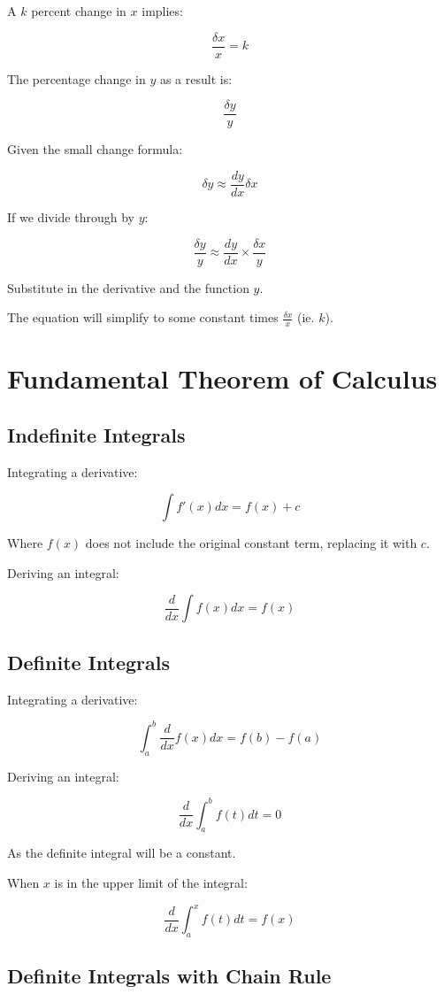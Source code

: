 \documentclass[a4paper,11pt]{article}
\begin{document}
A $k$ percent change in $x$ implies:

$$
\frac{\delta x}{x} = k
$$

The percentage change in $y$ as a result is:

$$
\frac{\delta y}{y}
$$

Given the small change formula:

$$
\delta y \approx \frac{dy}{dx} \delta x
$$

If we divide through by $y$:

$$
\frac{\delta y}{y} \approx \frac{dy}{dx} \times \frac{\delta x}{y}
$$

Substitute in the derivative and the function $y$.

The equation will simplify to some constant times $\frac{\delta x}{x}$
(ie. $k$).



\section{Fundamental Theorem of Calculus}

\subsection{Indefinite Integrals}

Integrating a derivative:

$$
\int f'(x) dx = f(x) + c
$$

Where $f(x)$ does not include the original constant term, replacing it with $c$.

Deriving an integral:

$$
\frac{d}{dx} \int f(x) dx = f(x)
$$


\subsection{Definite Integrals}

Integrating a derivative:

$$
\int_a^b \frac{d}{dx} f(x) dx = f(b) - f(a)
$$

Deriving an integral:

$$
\frac{d}{dx} \int_a^b f(t) dt = 0
$$

As the definite integral will be a constant.

When $x$ is in the upper limit of the integral:

$$
\frac{d}{dx} \int_a^x f(t) dt = f(x)
$$


\subsection{Definite Integrals with Chain Rule}
\end{document}
